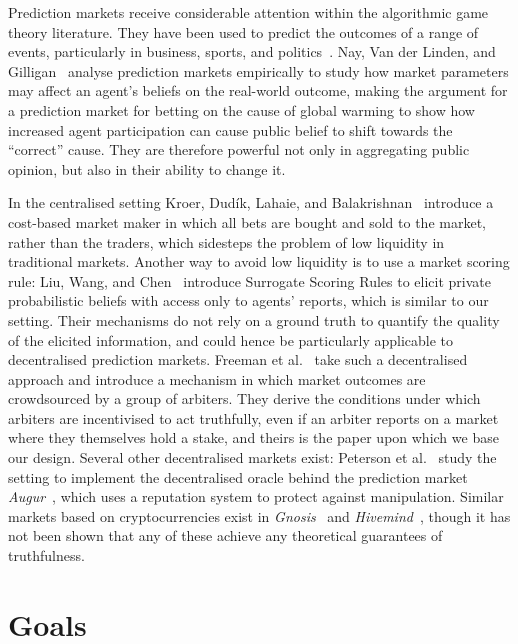 \documentclass[10pt,a4paper]{article}
\theoremstyle{plain}
\theoremstyle{definition}
\begin{document}
Prediction markets receive considerable attention within the algorithmic game
theory literature. They have been used to predict the outcomes of a range of
events, particularly in business, sports, and politics~\cite{Spann2003,
Berg2006}. Nay, Van der Linden, and Gilligan~\cite{Nay2016} analyse prediction
markets empirically to study how market parameters may affect an agent's
beliefs on the real-world outcome, making the argument for a prediction market
for betting on the cause of global warming to show how increased agent
participation can cause public belief to shift towards the ``correct'' cause.
They are therefore powerful not only in aggregating public opinion, but also in
their ability to change it.

In the centralised setting Kroer, Dud\'ik, Lahaie, and
Balakrishnan~\cite{Kroer2016} introduce a cost-based market maker in which all
bets are bought and sold to the market, rather than the traders, which
sidesteps the problem of low liquidity in traditional markets. Another way to
avoid low liquidity is to use a market scoring rule: Liu, Wang, and
Chen~\cite{Liu2020} introduce Surrogate Scoring Rules to elicit private
probabilistic beliefs with access only to agents' reports, which is similar to
our setting. Their mechanisms do not rely on a ground truth to quantify the
quality of the elicited information, and could hence be particularly applicable
to decentralised prediction markets. Freeman et al.~\cite{CODiPM} take such a
decentralised approach and introduce a mechanism in which market outcomes are
crowdsourced by a group of arbiters. They derive the conditions under which
arbiters are incentivised to act truthfully, even if an arbiter reports on a
market where they themselves hold a stake, and theirs is the paper upon which
we base our design. Several other decentralised markets exist: Peterson et
al.~\cite{Peterson2015} study the setting to implement the decentralised oracle
behind the prediction market \emph{Augur}~\cite{Augur}, which uses a reputation
system to protect against manipulation. Similar markets based on
cryptocurrencies exist in \emph{Gnosis}~\cite{Gnosis} and
\emph{Hivemind}~\cite{Hivemind}, though it has not been shown that any of these
achieve any theoretical guarantees of truthfulness.

\section{Goals}

\label{sec:goals}
\end{document}
